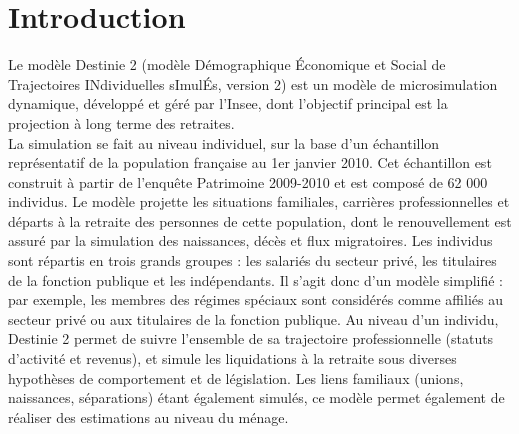 \section{Introduction}
Le modèle Destinie 2 (modèle Démographique Économique et Social de Trajectoires INdividuelles sImulÉs, version 2) est un modèle de microsimulation dynamique, développé et géré par l'Insee, dont l'objectif principal est la projection à long terme des retraites.\\

La simulation se fait au niveau individuel, sur la base d'un échantillon représentatif de la population française au 1er janvier 2010. Cet échantillon est construit à partir de l'enquête Patrimoine 2009-2010 et est composé de 62 000 individus. Le modèle projette les situations familiales, carrières professionnelles et départs à la retraite des personnes de cette population, dont le renouvellement est assuré par la simulation des naissances, décès et flux migratoires. Les individus sont répartis en trois grands groupes : les salariés du secteur privé, les titulaires de la fonction publique et les indépendants. Il s'agit donc d'un modèle simplifié : par exemple, les membres des régimes spéciaux sont considérés comme affiliés au secteur privé ou aux titulaires de la fonction publique. Au niveau d’un individu, Destinie 2 permet de suivre l’ensemble de sa trajectoire professionnelle (statuts d’activité et revenus), et simule les liquidations à la retraite sous diverses hypothèses de comportement et de législation. Les liens familiaux (unions, naissances, séparations) étant également simulés, ce modèle permet également de réaliser des estimations au niveau du ménage.\\

